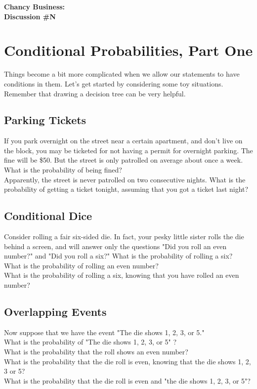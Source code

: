 \documentclass[12pt]{amsart}
\theoremstyle{definition}
\begin{document}
\begin{center}
\textbf{\Huge
Chancy Business:\\ Discussion \#N
}
\end{center}


\vspace{.25in}

\section*{Conditional Probabilities, Part One}


Things become a bit more complicated when we allow our statements to have conditions in them. Let's get started by considering some toy situations. Remember that drawing a decision tree can be very helpful.

\subsection*{Parking Tickets} If you park overnight on the street near a certain apartment, and don't live on the block, you may be ticketed for not having a permit for overnight parking. The fine will be \$50. But the street is only patrolled on average about once a week.\\
What is the probability of being fined?\\
Apparently, the street is never patrolled on two consecutive nights. What is the probability of getting a ticket tonight, assuming that you got a ticket last night?\\

\vspace{1cm}

\subsection*{Conditional Dice}
Consider rolling a fair six-sided die. In fact, your pesky little sister rolls the die behind a screen, and will answer only the questions "Did you roll an even number?" and "Did you roll a six?"
What is the probability of rolling a six?\\
What is the probability of rolling an even number?\\
What is the probability of rolling a six, knowing that you have rolled an even number?\\

\vspace{1cm}

\subsection*{Overlapping Events}
Now suppose that we have the event "The die shows 1, 2, 3, or 5." \\
What is the probability of "The die shows 1, 2, 3, or 5" ?\\
What is the probability that the roll shows an even number?\\
What is the probability that the die roll is even, knowing that the die shows 1, 2, 3 or 5?\\
What is the probability that the die roll is even and "the die shows 1, 2, 3, or 5"?\\
\end{document}
